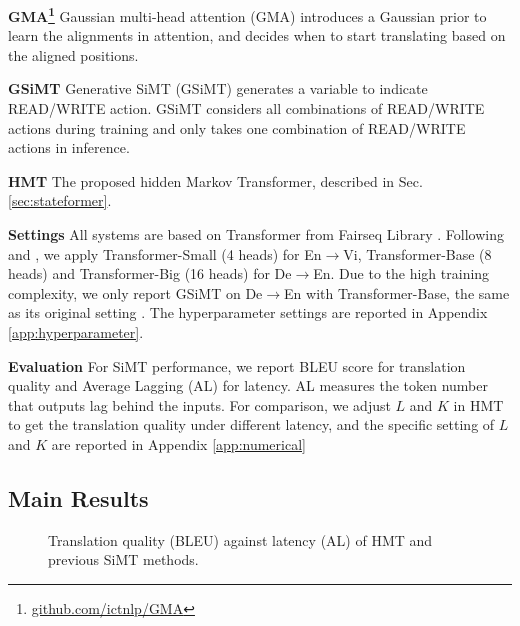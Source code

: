 \documentclass{article} %
\begin{document}
\vspace{-2mm}

{\bf GMA\footnote{\url{github.com/ictnlp/GMA}}} \citep{zhang-feng-2022-gaussian} Gaussian multi-head attention (GMA) introduces a Gaussian prior to learn the alignments in attention, and decides when to start translating based on the aligned positions.

\vspace{-2mm}

{\bf GSiMT} \citep{miao-etal-2021-generative} Generative SiMT (GSiMT) generates a variable to indicate READ/WRITE action. GSiMT considers all combinations of READ/WRITE actions during training and only takes one combination of READ/WRITE actions in inference.

\vspace{-2mm}

{\bf HMT} The proposed hidden Markov Transformer, described in Sec.\ref{sec:stateformer}.

\textbf{Settings} All systems are based on Transformer \citep{NIPS2017_7181} from Fairseq Library \citep{ott-etal-2019-fairseq}. Following \citet{Ma2019a} and \citet{miao-etal-2021-generative}, we apply Transformer-Small (4 heads) for En$\rightarrow$Vi, Transformer-Base (8 heads) and Transformer-Big (16 heads) for De$\rightarrow$En. Due to the high training complexity, we only report GSiMT on De$\rightarrow$En with Transformer-Base, the same as its original setting \citep{miao-etal-2021-generative}. The hyperparameter settings are reported in Appendix \ref{app:hyperparameter}.


\textbf{Evaluation} For SiMT performance, we report BLEU score \citep{papineni-etal-2002-bleu} for translation quality and Average Lagging (AL) \citep{ma-etal-2019-stacl} for latency. AL measures the token number that outputs lag behind the inputs. For comparison, we adjust $L$ and $K$ in HMT to get the translation quality under different latency, and the specific setting of $L$ and $K$ are reported in Appendix \ref{app:numerical}

\subsection{Main Results}

\begin{figure}[t]
\centering
{}
\vspace{-0.1in}
\caption{Translation quality (BLEU) against latency (AL) of HMT and previous SiMT methods.}
\label{fig:main}
\end{figure}
\end{document}

